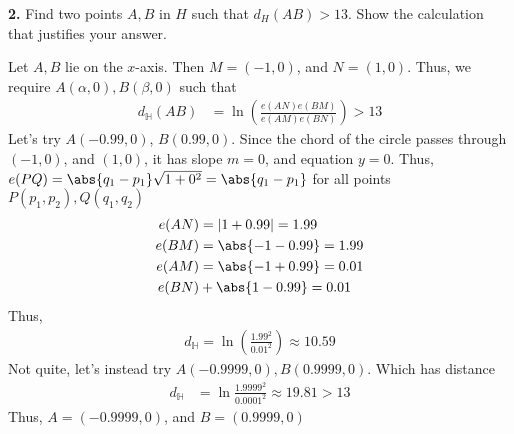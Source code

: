 \documentclass{report}
\begin{document}
    

    \begin{mdframed}
        \textbf{2.} Find two points $A, B$ in $H$ such that $d_H(AB) > 13$. Show the calculation that justifies your answer.
    \end{mdframed}
    \bigbreak \noindent 
    Let $A,B$ lie on the $x$-axis. Then $M = (-1,0)$, and $N = (1,0)$. Thus, we require $A(\alpha,0 ), B(\beta,0)$ such that
    \begin{align*}
        d_{\mathbb{H}}(AB) &= \ln{\left(\frac{e(AN)e(BM)}{e(AM)e(BN)}\right)} > 13
    \end{align*}
    Let's try $A(-0.99,0)$, $B(0.99,0)$. Since the chord of the circle passes through $(-1,0)$, and $(1,0)$, it has slope $m=0$, and equation $y=0$. Thus, $e(PQ) = \abs{q_{1}-p_{1}} \sqrt{1+0^{2}} = \abs{q_{1} - p_{1}}$ for all points $P(p_{1}, p_{2}), Q(q_{1}, q_{2})$
    \begin{align*}
        e(AN) &= \left\lvert 1+0.99 \right\rvert = 1.99 \\
        e(BM) &= \abs{-1-0.99} = 1.99 \\
        e(AM) &= \abs{-1+0.99} = 0.01 \\
        e(BN) &+ \abs{1-0.99} = 0.01
    \end{align*}
    Thus,
    \begin{align*}
        d_{\mathbb{H}} = \ln{\left(\frac{1.99^{2}}{0.01^{2}}\right)} \approx 10.59
    \end{align*}
    Not quite, let's instead try $A(-0.9999,0), B(0.9999,0)$. Which has distance
    \begin{align*}
        d_{\mathbb{H}} &= \ln{\frac{1.9999^{2}}{0.0001^{2}}} \approx 19.81 > 13
    \end{align*}
    Thus, $A = (-0.9999,0 )$, and $B = (0.9999,0 )$
\end{document}
